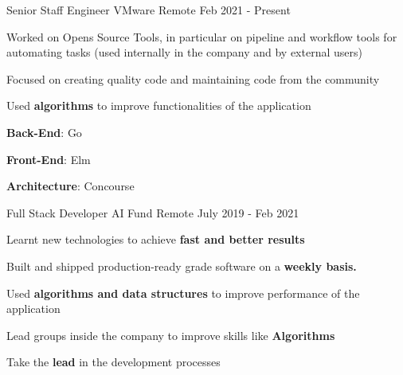 

\begin{cventries}

    \cventry
    {Senior Staff Engineer}
    {VMware}
    {Remote}
    {Feb 2021 - Present}
    {
      \begin{cvitems}
        \item {Worked on Opens Source Tools, in particular on pipeline and workflow tools for automating tasks (used internally in the company and by external users)}
        \item {Focused on creating quality code and maintaining code from the community}
        \item {Used \textbf{algorithms} to improve functionalities of the application}
        \item {\textbf{Back-End}: Go {\dotsep} }
        \item {\textbf{Front-End}: Elm {\dotsep} }
        \item {\textbf{Architecture}: Concourse {\dotsep} }
      \end{cvitems}
      \begin{cvsubentries}
      \end{cvsubentries}
    }
    \cventry
    {Full Stack Developer}
    {AI Fund}
    {Remote}
    {July 2019 - Feb 2021}
    {
      \begin{cvitems}
        \item {Learnt new technologies to achieve \textbf{fast and better results}}
        \item {Built and shipped production-ready grade software on a \textbf{weekly basis.}}
        \item {Used \textbf{algorithms and data structures} to improve performance of the application}
        \item {Lead groups inside the company to improve skills like \textbf{Algorithms}}
        \item {Take the \textbf{lead} in the development processes}

\end{cvitems}}
\end{cventries}
